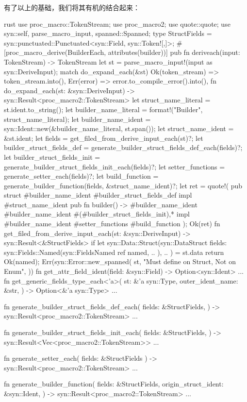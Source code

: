 有了以上的基础，我们将其有机的结合起来：
\begin{code-block}{rust}
use proc_macro::TokenStream;
use proc_macro2;
use quote::quote;
use syn::{self, parse_macro_input, spanned::Spanned};
type StructFields = syn::punctuated::Punctuated<syn::Field, syn::Token![,]>;
#[proc_macro_derive(BuilderEach, attributes(builder))]
pub fn deriveach(input: TokenStream) -> TokenStream {
    let st = parse_macro_input!(input as syn::DeriveInput);
    match do_expand_each(&st) {
        Ok(token_stream) => token_stream.into(),
        Err(error) => error.to_compile_error().into(),
    }
}
fn do_expand_each(st: &syn::DeriveInput) -> syn::Result<proc_macro2::TokenStream> {
    let struct_name_literal = st.ident.to_string();
    let builder_name_literal = format!("{}Builder", struct_name_literal);
    let builder_name_ident = syn::Ident::new(&builder_name_literal, st.span());
    let struct_name_ident = &st.ident;
    let fields = get_filed_from_derive_input_each(st)?;
    let builder_struct_fields_def = generate_builder_struct_fields_def_each(fields)?;
    let builder_struct_fields_init = generate_builder_struct_fields_init_each(fields)?;
    let setter_functions = generate_setter_each(fields)?;
    let build_function = generate_builder_function(fields, &struct_name_ident)?;
    let ret = quote!(
        pub struct #builder_name_ident {
            #builder_struct_fields_def
        }
        impl #struct_name_ident {
            pub fn builder() -> #builder_name_ident {
                #builder_name_ident {
                    #(#builder_struct_fields_init),*
                }
            }
        }
        impl #builder_name_ident {
            #setter_functions
            #build_function
        }
    );
    Ok(ret)
}
fn get_filed_from_derive_input_each(st: &syn::DeriveInput) -> syn::Result<&StructFields> {
    if let syn::Data::Struct(syn::DataStruct {
        fields: syn::Fields::Named(syn::FieldsNamed { ref named, .. }),
        ..
    }) = st.data
    {
        return Ok(named);
    }
    Err(syn::Error::new_spanned(
        st,
        "Must define on Struct, Not on Enum",
    ))
}
fn get_attr_field_ident(field: &syn::Field) -> Option<syn::Ident> {...}
fn get_generic_fields_type_each<'a>(
    st: &'a syn::Type,
    outer_ident_name: &str,
) -> Option<&'a syn::Type> {...}

fn generate_builder_struct_fields_def_each(
    fields: &StructFields,
) -> syn::Result<proc_macro2::TokenStream> {...}

fn generate_builder_struct_fields_init_each(
    fields: &StructFields,
) -> syn::Result<Vec<proc_macro2::TokenStream>> {...}

fn generate_setter_each(
    fields: &StructFields
) -> syn::Result<proc_macro2::TokenStream> {...}

fn generate_builder_function(
    fields: &StructFields,
    origin_struct_ident: &syn::Ident,
) -> syn::Result<proc_macro2::TokenStream> {...}
\end{code-block}

